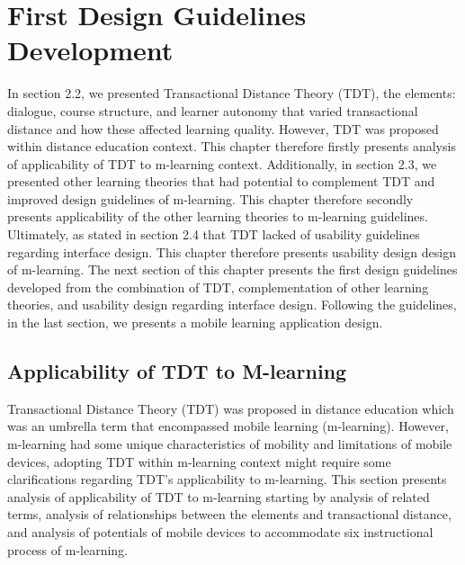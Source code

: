 \chapter{First Design Guidelines Development}\label{C:bin}

In section 2.2, we presented Transactional Distance Theory (TDT), the elements: dialogue, course structure, and learner autonomy that varied transactional distance and how these affected learning quality. However, TDT was proposed within distance education context. This chapter therefore firstly presents analysis of applicability of TDT to m-learning context. Additionally, in section 2.3, we presented other learning theories that had potential to complement TDT and improved design guidelines of m-learning. This chapter therefore secondly presents applicability of the other learning theories to m-learning guidelines. Ultimately, as stated in section 2.4 that TDT lacked of usability guidelines regarding interface design. This chapter therefore presents usability design design of m-learning. The next section of this chapter presents the first design guidelines developed from the combination of TDT, complementation of other learning theories, and usability design regarding interface design. Following the guidelines, in the last section, we presents a mobile learning application design. 
\newpage 
\section{Applicability of TDT to M-learning} 

Transactional Distance Theory (TDT) was proposed in distance education which was an umbrella term that encompassed mobile learning (m-learning). However, m-learning had some unique characteristics of mobility and limitations of mobile devices, adopting TDT within m-learning context might require some clarifications regarding TDT's applicability to m-learning. This section presents analysis of applicability of TDT to m-learning starting by analysis of related terms, analysis of relationships between the elements and transactional distance, and analysis of potentials of mobile devices to accommodate six instructional process of m-learning. 



